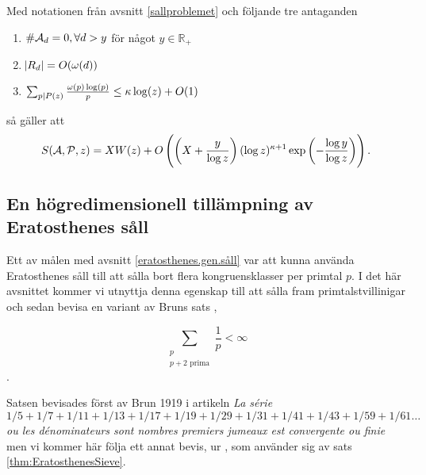 \begin{theorem}\label{thm:EratosthenesSieve}
Med notationen från avsnitt \ref{sallproblemet} och följande tre antaganden 
\begin{enumerate}
    \item \(\card{\A_d} = 0, \forall d > y\) för något \(y \in \mathbb{R}_+\)
    \item \(\abs{R_d} = O(\omega(d))\)
    \item \(\sum_{p \divides P(z)} \frac{\omega(p) \log(p)}{p} \leq \kappa \log(z) + O(1)\)
\end{enumerate}
så gäller att
\begin{align*}
    \S{A}{P}{z} = X W(z) + O\left(\left(X + \frac{y}{\log z} \right) (\log z)^{\kappa + 1} \exp{\left(-\frac{\log y}{\log z}\right)} \right). 
\end{align*}

\end{theorem}
    

\subsection{En högredimensionell tillämpning av Eratosthenes såll}\label{eratosthenes.tillämpning}

Ett av målen med avsnitt \ref{eratosthenes.gen.såll} var att kunna använda Eratosthenes såll till att sålla bort flera kongruensklasser per primtal $p$. I det här avsnittet kommer vi utnyttja denna egenskap till att sålla fram primtalstvillinigar och sedan bevisa en variant av Bruns sats \cite[Korollarium 5.4.5]{cojocarumurty},
\begin{theorem}
    \[\sum_{\substack{p \\ p + 2 \text{ prima}}} \frac{1}{p} < \infty\]. 
\end{theorem} 
Satsen bevisades först av Brun 1919 i artikeln \textit{La série} \(1/5 + 1/7 + 1/11 + 1/13 + 1/17 + 1/19 + 1/29 + 1/31 + 1/41 + 1/43 + 1/59 + 1/61 \dots\) \textit{ou les dénominateurs sont \guillemotleft nombres premiers jumeaux \guillemotright est convergente ou finie} men vi kommer här följa ett annat bevis, ur \cite[s.72-73]{cojocarumurty}, som använder sig av sats \ref{thm:EratosthenesSieve}.

